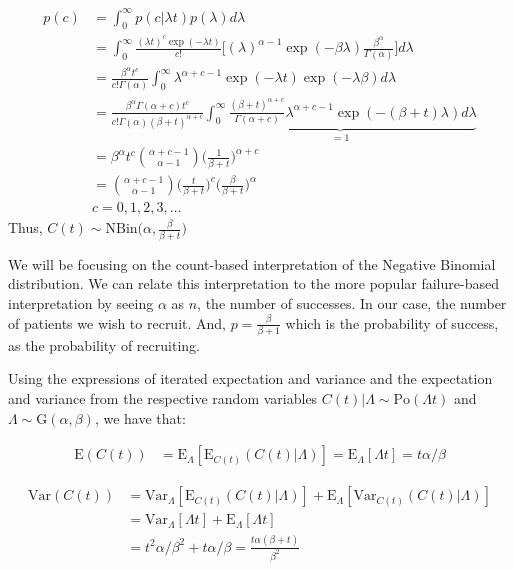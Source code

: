 \begin{align*}
p(c)&=\int^\infty_0 p(c|\lambda t) p(\lambda) d\lambda\\
&=\int^\infty_0 \frac{(\lambda t)^c\exp(-\lambda t)}{c!}\Bigg[(\lambda)^{\alpha-1}\exp(-\beta\lambda )\frac{\beta^\alpha}{\Gamma(\alpha)}\Bigg]d\lambda\\
&=\frac{\beta^\alpha t^c}{c!\Gamma(\alpha)}\int^\infty_0 \lambda^{\alpha+c-1}\exp(-\lambda t)\exp(-\lambda\beta)d\lambda\\
&=\frac{\beta^\alpha\Gamma(\alpha+c) t^c}{c!\Gamma(\alpha) (\beta+t)^{\alpha+c}}\underbrace{\int^\infty_0 \frac{(\beta+t)^{\alpha+c}}{\Gamma(\alpha+c)} \lambda^{\alpha+c-1}\exp(-(\beta+t)\lambda)d\lambda}_{=1}\\
&=\beta^\alpha t^c\binom{\alpha+c-1}{\alpha-1}\Bigg (\frac{1}{\beta+t}\Bigg)^{\alpha+c}\\
&=\binom{\alpha+c-1}{\alpha-1}\Bigg (\frac{t}{\beta+t}\Bigg)^{c} \Bigg(\frac{\beta}{\beta+t}\Bigg)^{\alpha}\\
& c = 0,1,2,3,\ldots
\end{align*}
Thus, $C(t)\sim \textrm{NBin} \Bigg(\alpha, \frac{\beta}{\beta+t}\Bigg)$

We will be focusing on the count-based interpretation of the Negative Binomial distribution. We can relate this interpretation to the more popular failure-based interpretation by seeing $\alpha$ as $n$, the number of successes. In our case, the number of patients we wish to recruit. And, $p = \frac{\beta}{\beta+1}$ which is the probability of success, as the probability of recruiting.


Using the expressions of iterated expectation and variance \citep{held2014applied} and the expectation and variance from the respective random variables $C(t)|\Lambda \sim \textrm{Po}(\Lambda t)$ and $\Lambda \sim \textrm{G}(\alpha,\beta)$, we have that:


\begin{align*}
\textrm{E}(C(t)) &= \textrm{E}_{\Lambda}[\textrm{E}_{C(t)} (C(t)|\Lambda)] = \textrm{E}_{\Lambda}[\Lambda t] = t\alpha/\beta
\end{align*}

\begin{align*}
\textrm{Var}(C(t)) &= \textrm{Var}_{\Lambda}[\textrm{E}_{C(t)} (C(t)|\Lambda)] + \textrm{E}_{\Lambda}[\textrm{Var}_{C(t)}(C(t)|\Lambda)]\\
&=\textrm{Var}_{\Lambda}[\Lambda t] + \textrm{E}_{\Lambda}[\Lambda t] \\
&=t^2\alpha/\beta^2 + t\alpha/\beta = \frac{t\alpha(\beta+t)}{\beta^2}
\end{align*}

